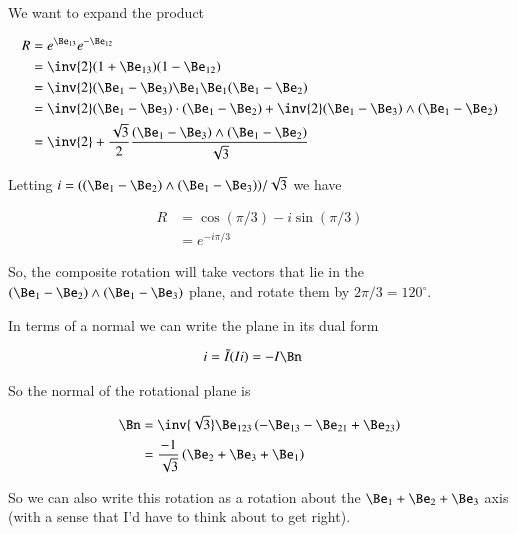 We want to expand the product

\begin{align*}
R 
&= e^{\Be_{13}} e^{-\Be_{12}} \\
&= \inv{2} (1 + \Be_{13}) (1 - \Be_{12}) \\
&= \inv{2} (\Be_1 - \Be_{3}) \Be_1 \Be_1 (\Be_1 - \Be_{2}) \\
&= \inv{2} (\Be_1 - \Be_{3}) \cdot (\Be_1 - \Be_{2}) +\inv{2} (\Be_1 - \Be_{3}) \wedge (\Be_1 - \Be_{2}) \\
&= \inv{2} + \frac{\sqrt{3}}{2} \frac{(\Be_1 - \Be_{3}) \wedge (\Be_1 - \Be_{2})}{\sqrt{3}} \\
\end{align*}

Letting $i = ((\Be_1 - \Be_{2}) \wedge (\Be_1 - \Be_{3}))/\sqrt{3}$ we have

\begin{align*}
R 
&= \cos(\pi/3) - i\sin(\pi/3) \\
&= e^{-i \pi/3}
\end{align*}

So, the composite rotation will take vectors that lie in the $(\Be_1 - \Be_{2}) \wedge (\Be_1 - \Be_{3})$ plane, and rotate them by $2\pi/3 = 120^\circ$.

In terms of a normal we can write the plane in its dual form 

\begin{align*}
i &= \tilde{I}(I i) = -I \Bn
\end{align*}

So the normal of the rotational plane is

\begin{align*}
\Bn 
&= \inv{\sqrt{3}} \Be_{123} \left( -\Be_{13} - \Be_{21} + \Be_{23} \right) \\
&= \frac{-1}{\sqrt{3}} \left( \Be_{2} + \Be_{3} + \Be_{1} \right) \\
\end{align*}

So we can also write this rotation as a rotation about the $\Be_1 + \Be_2 + \Be_3$ axis (with a sense that I'd have to think about to get right).

%
%

%
